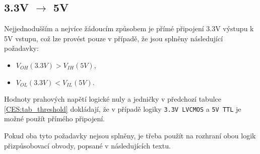     \subsection{3.3V $\rightarrow$ 5V} %
      Nejjednodušším a nejvíce žádoucím způsobem je přímé připojení 3.3V výstupu k 5V vstupu, což
      lze provést pouze v případě, že jsou splněny následující požadavky:
        \begin{itemize}[noitemsep]
          \item $V_{OH}(3.3V)>V_{IH}(5V)$,
          \item $V_{OL}(3.3V)<V_{IL}(5V)$.
        \end{itemize}
      Hodnoty prahových napětí logické nuly a jedničky v předchozí tabulce \ref{CES:tab_threshold}
      dokládají, že v případě logiky \texttt{3.3V LVCMOS} a \texttt{5V TTL} je možné použít přímého
      připojení. 


      Pokud oba tyto požadavky nejsou splněny, je třeba použít na rozhraní obou logik
      přizpůsobovací obvody, popsané v následujících textu. 

